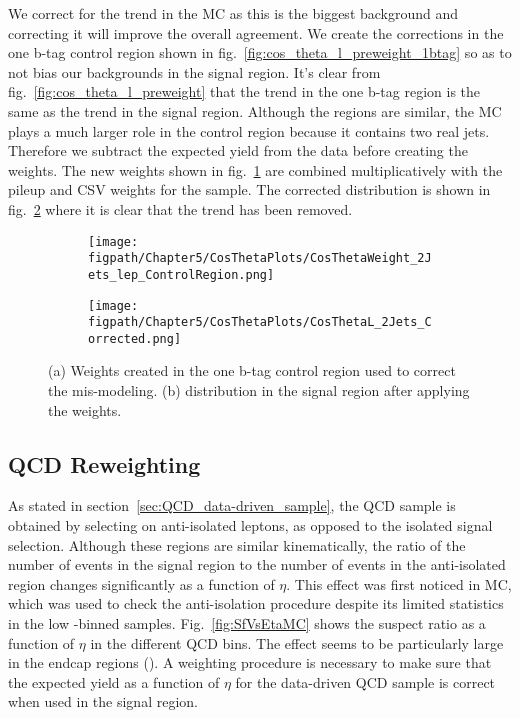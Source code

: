 We correct for the trend in the \Wjets MC as this is the biggest background and correcting it will improve the overall agreement.
We create the corrections in the one b-tag control region shown in fig.~\ref{fig:cos_theta_l_preweight_1btag} so as to not bias our backgrounds in the signal region.
It's clear from fig.~\ref{fig:cos_theta_l_preweight} that the trend in the one b-tag region is the same as the trend in the signal region.
Although the regions are similar, the \ttbar MC plays a much larger role in the control region because it contains two real \cPqb jets.
Therefore we subtract the expected \ttbar yield from the data before creating the weights.
The new weights shown in fig.~\ref{fig:cos_theta_l_weight} are combined multiplicatively with the pileup and CSV weights for the \Wjets sample.
The corrected distribution is shown in fig.~\ref{fig:cos_theta_l_corrected} where it is clear that the trend has been removed.

\begin{figure}[!hbt]
    \centering
    \begin{subfigure}[t]{0.48\textwidth}
      \texttt{[image: \\figpath/Chapter5/CosThetaPlots/CosThetaWeight\_2Jets\_lep\_ControlRegion.png]}
      \caption{}
      \label{fig:cos_theta_l_weight}
    \end{subfigure}
    \begin{subfigure}[t]{0.48\textwidth}
      \texttt{[image: \\figpath/Chapter5/CosThetaPlots/CosThetaL\_2Jets\_Corrected.png]}
      \caption{}
      \label{fig:cos_theta_l_corrected}
    \end{subfigure}
    \caption{(a) Weights created in the one b-tag control region used to correct the \costhetal mis-modeling. (b) \costhetal distribution in the signal region after applying the weights.}
    \label{fig:cos_theta_l_postweight}
\end{figure}

\subsection{QCD Reweighting}

As stated in section~\ref{sec:QCD_data-driven_sample}, the QCD sample is obtained by selecting on anti-isolated leptons, as opposed to the isolated signal selection.
Although these regions are similar kinematically, the ratio of the number of events in the signal region to the number of events in the anti-isolated region changes significantly as a function of $\eta$.
This effect was first noticed in MC, which was used to check the anti-isolation procedure despite its limited statistics in the low \pthat-binned samples.
Fig.~\ref{fig:SfVsEtaMC} shows the suspect ratio as a function of $\eta$ in the different QCD \pthat bins.
The effect seems to be particularly large in the endcap regions ().
A weighting procedure is necessary to make sure that the expected yield as a function of $\eta$ for the data-driven QCD sample is correct when used in the signal region.

